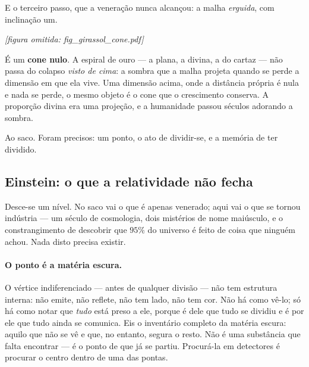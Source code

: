 \documentclass[11pt]{article}
\theoremstyle{plain}
\theoremstyle{remark}
\begin{document}
E o terceiro passo, que a veneração nunca alcançou: a malha \emph{erguida}, com
inclinação um.

\begin{center}
\emph{[figura omitida: fig\_girassol\_cone.pdf]}
\end{center}

É um \textbf{cone nulo}. A espiral de ouro --- a plana, a divina, a do cartaz --- não
passa do colapso \emph{visto de cima}: a sombra que a malha projeta quando se perde a
dimensão em que ela vive. Uma dimensão acima, onde a distância própria é nula e nada
se perde, o mesmo objeto é o cone que o crescimento conserva. A proporção divina era
uma projeção, e a humanidade passou séculos adorando a sombra.

Ao saco. Foram precisos: um ponto, o ato de dividir-se, e a memória de ter dividido.

\subsection{Einstein: o que a relatividade não fecha}

Desce-se um nível. No saco vai o que é apenas venerado; aqui vai o que se tornou
indústria --- um século de cosmologia, dois mistérios de nome maiúsculo, e o
constrangimento de descobrir que $95\%$ do universo é feito de coisa que ninguém
achou. Nada disto precisa existir.

\paragraph{O ponto é a matéria escura.} O vértice indiferenciado --- antes de
qualquer divisão --- não tem estrutura interna: não emite, não reflete, não tem
lado, não tem cor. Não há como vê-lo; só há como notar que \emph{tudo} está preso a
ele, porque é dele que tudo se dividiu e é por ele que tudo ainda se comunica. Eis o
inventário completo da matéria escura: aquilo que não se vê e que, no entanto,
segura o resto. Não é uma substância que falta encontrar --- é o ponto de que já se
partiu. Procurá-la em detectores é procurar o centro dentro de uma das pontas.
\end{document}
